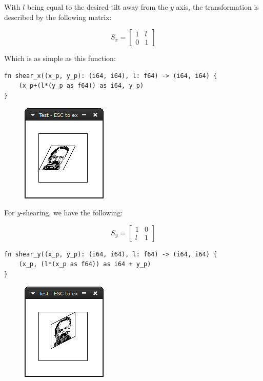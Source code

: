 \documentclass[12pt,a4,oneside,usenames,dvipsnames]{book}
\begin{document}
With $l$ being equal to the desired tilt away from the $y$ axis, the transformation is described by the following matrix:%

\[
  S_x =
  \begin{bmatrix}
    1 & l\\
    0 & 1
  \end{bmatrix}
\]

Which is as simple as this function:

\begin{verbatim}
fn shear_x((x_p, y_p): (i64, i64), l: f64) -> (i64, i64) {
    (x_p+(l*(y_p as f64)) as i64, y_p)
}
\end{verbatim}

\begin{figure}[H]
{\centering\includegraphics{figures/shearing-1.png}}
\end{figure}

For $y$-shearing, we have the following:

\[
  S_y =
  \begin{bmatrix}
    1 & 0\\
    l & 1
  \end{bmatrix}
\]

\begin{verbatim}
fn shear_y((x_p, y_p): (i64, i64), l: f64) -> (i64, i64) {
    (x_p, (l*(x_p as f64)) as i64 + y_p)
}
\end{verbatim}

\begin{figure}[H]
{\centering\includegraphics{figures/shearing-2.png}}
\end{figure}
\end{document}
